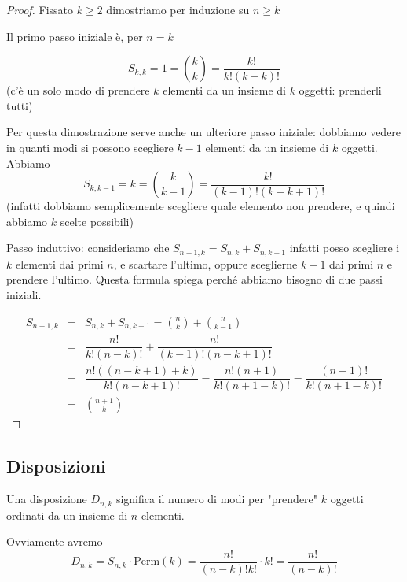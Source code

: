 \begin{proof}
    Fissato $ k \geq 2 $ dimostriamo per induzione su $ n \geq k $
    
    Il primo passo iniziale \`e, per $ n = k $

    \begin{equation*}
        S_{k,k} = 1=\binom{k}{k}= \dfrac{k!}{k!(k-k)!}
    \end{equation*}
    (c'\`e un solo modo di prendere $k$ elementi da un insieme di $k$ oggetti: prenderli tutti)

    Per questa dimostrazione serve anche un ulteriore passo iniziale: dobbiamo vedere in quanti
    modi si possono scegliere $k-1$ elementi da un insieme di $k$ oggetti. Abbiamo
    \begin{equation*}
        S_{k,k-1}= k =\binom{k}{k-1}= \dfrac{k!}{(k-1)!(k-k+1)!}
    \end{equation*}
    (infatti dobbiamo semplicemente scegliere quale elemento non prendere, e quindi abbiamo
    $k$ scelte possibili)

    Passo induttivo: consideriamo che $S_{n+1,k} = S_{n,k} + S_{n,k-1}$ infatti posso scegliere i $k$
    elementi dai primi $n$, e scartare l'ultimo, oppure sceglierne $k-1$ dai primi $n$ e prendere l'ultimo.
    Questa formula spiega perch\'e abbiamo bisogno di due passi iniziali.

    \begin{eqnarray*}
        S_{n+1,k} &=& S_{n,k} + S_{n,k-1}= \binom{n}{k}+\binom{n}{k-1}\\
                &= &\dfrac{n!}{k!(n-k)!} + \dfrac{n!}{(k-1)!(n-k+1)!} \\
                &= &\dfrac{n!((n-k+1) + k)}{k!(n-k+1)!} = \dfrac{n!(n+1)}{k!(n+1-k)!} = \dfrac{(n+1)!}{k!(n+1-k)!} \\
                &= &\binom{n+1}{k}
    \end{eqnarray*}
\end{proof}

\subsection{Disposizioni}

\begin{defn}
    Una disposizione $ D_{n,k} $ significa il numero di modi per "prendere" $ k $ oggetti ordinati da un insieme di $ n $ elementi.
\end{defn}
Ovviamente avremo
    \begin{equation}
    D_{n,k} = S_{n,k} \cdot \text{Perm}(k) = \dfrac{n!}{(n-k)!k!} \cdot k! = \dfrac{n!}{(n-k)!}
    \end{equation}

